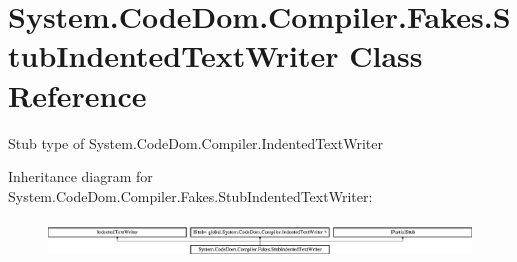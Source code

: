 \hypertarget{class_system_1_1_code_dom_1_1_compiler_1_1_fakes_1_1_stub_indented_text_writer}{\section{System.\-Code\-Dom.\-Compiler.\-Fakes.\-Stub\-Indented\-Text\-Writer Class Reference}
\label{class_system_1_1_code_dom_1_1_compiler_1_1_fakes_1_1_stub_indented_text_writer}
}


Stub type of System.\-Code\-Dom.\-Compiler.\-Indented\-Text\-Writer 


Inheritance diagram for System.\-Code\-Dom.\-Compiler.\-Fakes.\-Stub\-Indented\-Text\-Writer\-:\begin{figure}[H]
\begin{center}
\leavevmode
\includegraphics[height=1.003584cm]{class_system_1_1_code_dom_1_1_compiler_1_1_fakes_1_1_stub_indented_text_writer}
\end{center}
\end{figure}
